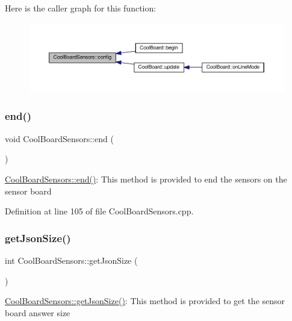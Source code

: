 Here is the caller graph for this function\+:\nopagebreak
\begin{figure}[H]
\begin{center}
\leavevmode
\includegraphics[width=350pt]{class_cool_board_sensors_a9a218895c5423375c33c08f2c56fb23a_icgraph}
\end{center}
\end{figure}
\mbox{\label{class_cool_board_sensors_a4902b69f6e628bd6557193758fdd2bae}} 
\subsubsection{\texorpdfstring{end()}{end()}}
{\footnotesize\ttfamily void Cool\+Board\+Sensors\+::end (\begin{DoxyParamCaption}{ }\end{DoxyParamCaption})}

\hyperlink{class_cool_board_sensors_a4902b69f6e628bd6557193758fdd2bae}{Cool\+Board\+Sensors\+::end()}\+: This method is provided to end the sensors on the sensor board 

Definition at line 105 of file Cool\+Board\+Sensors.\+cpp.

\mbox{\label{class_cool_board_sensors_ab82c2a1633768ccd12a589320fa31a14}} 
\subsubsection{\texorpdfstring{get\+Json\+Size()}{getJsonSize()}}
{\footnotesize\ttfamily int Cool\+Board\+Sensors\+::get\+Json\+Size (\begin{DoxyParamCaption}{ }\end{DoxyParamCaption})}

\hyperlink{class_cool_board_sensors_ab82c2a1633768ccd12a589320fa31a14}{Cool\+Board\+Sensors\+::get\+Json\+Size()}\+: This method is provided to get the sensor board answer size 


